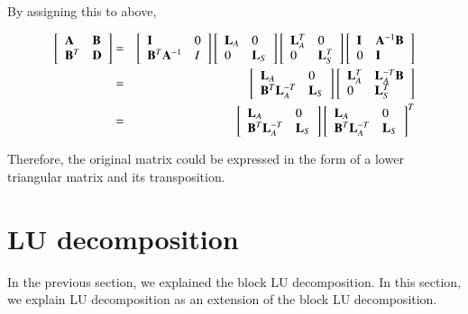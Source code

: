 By assigning this to above,

\begin{eqnarray}
\left[\begin{array}{ll}
\mathbf{A} & \mathbf{B}\\
\mathbf{B}^T & \mathbf{D}
\end{array}\right]
&=&
\left[\begin{array}{ll}
\mathbf{I} & 0\\
\mathbf{B}^T\mathbf{A}^{-1} & I
\end{array}\right]
\left[\begin{array}{ll}
\mathbf{L}_A & 0 \\
0 & \mathbf{L}_S
\end{array}\right]
\left[\begin{array}{ll}
\mathbf{L}_A^T & 0 \\
0 & \mathbf{L}_S^T\end{array}\right]
\left[\begin{array}{ll}
\mathbf{I} & \mathbf{A}^{-1}\mathbf{B}\\
0 & \mathbf{I}\end{array}\right]\\
&=&
\left[\begin{array}{ll}
\mathbf{L}_A & 0\\
\mathbf{B}^T\mathbf{L}_A^{-T} & \mathbf{L}_S
\end{array}\right]
\left[\begin{array}{ll}
\mathbf{L}_A^T & \mathbf{L}_A^{-T}\mathbf{B} \\
0 & \mathbf{L}_S^T
\end{array}\right]\\
&=&
\left[\begin{array}{ll}
\mathbf{L}_A & 0\\
\mathbf{B}^T\mathbf{L}_A^{-T} & \mathbf{L}_S
\end{array}\right]
\left[\begin{array}{ll}
\mathbf{L}_A & 0\\
\mathbf{B}^T\mathbf{L}_A^{-T} & \mathbf{L}_S
\end{array}\right]^T
\end{eqnarray}

Therefore, the original matrix could be expressed in the form of a lower triangular matrix and its transposition.

\section{LU decomposition}

In the previous section, we explained the block LU decomposition. 
%
In this section, we explain LU decomposition as an extension of the block LU decomposition.
%

